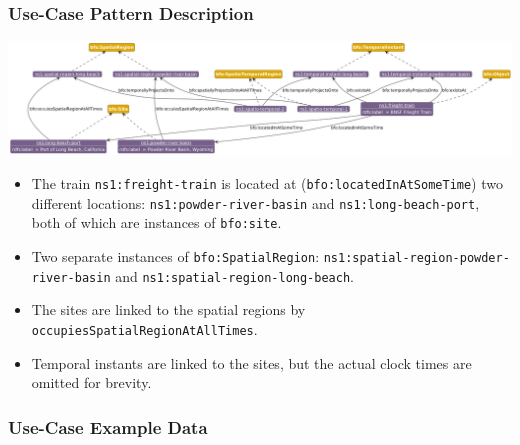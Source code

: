 \subsubsection*{Use-Case Pattern Description}
\includegraphics[scale=0.27]{scenarios/location-change/images/change-of-location-usecase1.png}
\begin{itemize}
    \item The train \texttt{ns1:freight-train} is located at (\texttt{bfo:locatedInAtSomeTime}) two different locations: \texttt{ns1:powder-river-basin} and \texttt{ns1:long-beach-port}, both of which are instances of \texttt{bfo:site}.
    \item Two separate instances of \texttt{bfo:SpatialRegion}: \texttt{ns1:spatial-region-powder-river-basin} and \texttt{ns1:spatial-region-long-beach}.
    \item The sites are linked to the spatial regions by \texttt{occupiesSpatialRegionAtAllTimes}.
    \item Temporal instants are linked to the sites, but the actual clock times are omitted for brevity.
\end{itemize}

\subsubsection*{Use-Case Example Data}

\begin{table}[]
\label{tab:freight-train-timetable}
\end{table}

